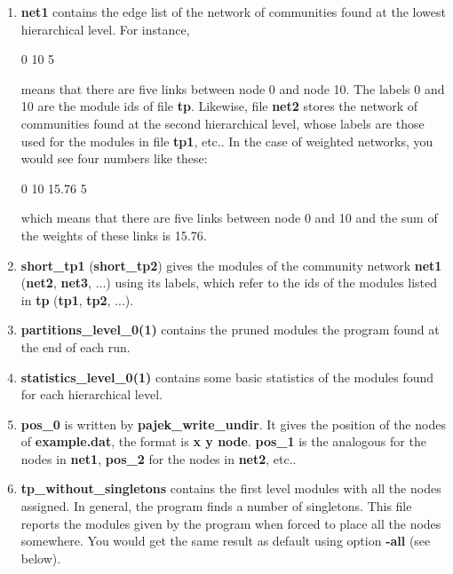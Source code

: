 \documentclass[11pt]{article}
\begin{document}
\begin{enumerate}
  \item \textbf{net1} contains the edge list of the network of
    communities found at the lowest hierarchical level. For instance,
  
0	10	5

  
  means that there are five links between node 0 and node 10. The
  labels 0 and 10
  are the module ids of file \textbf{tp}. 
Likewise, file  \textbf{net2} stores the network of communities found
at the second hierarchical level, whose labels are those used
for the modules in file \textbf{tp1}, etc.. In the case of weighted networks, you would see four numbers like these:
  
 0 10 15.76 5
 
which means that there are five links between node 0 and 10 and the sum of the weights of these links is 15.76.
     
  
  \item  \textbf{short\_tp1} ({\bf short\_tp2}) gives the modules of
    the community
    network \textbf{net1} ({\bf net2}, {\bf net3}, ...) using its
    labels, which refer to the ids of the modules listed in
    \textbf{tp} ({\bf tp1}, {\bf tp2}, ...).
     
  
  \item \textbf{partitions\_level\_0(1)}  contains the pruned modules the program found at the end of each run. 
  
  \item \textbf{statistics\_level\_0(1)}  contains some basic statistics of the modules found for each hierarchical level.

  
  \item \textbf{pos\_0} is written by \textbf{pajek\_write\_undir}. It
    gives the position of the nodes of \textbf{example.dat}, the
    format is \textbf{x y node}. \textbf{pos\_1} is the analogous for the
    nodes in \textbf{net1}, \textbf{pos\_2} for the nodes in
    \textbf{net2}, etc..
  
  \item \textbf{tp\_without\_singletons}  contains the first level modules with all the nodes assigned. In general, the program finds a number of singletons. This file reports the modules given by the program when forced to place all the nodes somewhere. You would get the same result as default using option \textbf{-all} (see below).
  
\end{enumerate}
\end{document}
